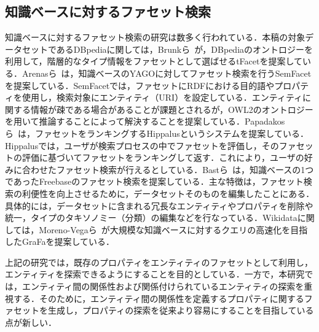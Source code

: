 \subsection{知識ベースに対するファセット検索}
知識ベースに対するファセット検索の研究は数多く行われている．本稿の対象データセットであるDBpediaに関しては，Brunkら~\cite{Brunk2011tFacetHF}が，DBpediaのオントロジーを利用して，階層的なタイプ情報をファセットとして選ばせるtFacetを提案している．Arenasら~\cite{Arenas:2014:SSF:2567948.2577011}は，知識ベースのYAGOに対してファセット検索を行うSemFacetを提案している．SemFacetでは，ファセットにRDFにおける目的語やプロパティを使用し，検索対象にエンティティ（URI）を設定している．エンティティに関する情報が疎である場合があることが課題とされるが，OWL2のオントロジーを用いて推論することによって解決することを提案している．Papadakosら~\cite{Papadakos2014HippalusPF}は，ファセットをランキングするHippalusというシステムを提案している．Hippalusでは，ユーザが検索プロセスの中でファセットを評価し，そのファセットの評価に基づいてファセットをランキングして返す．これにより，ユーザの好みに合わせたファセット検索が行えるとしている．Bastら~\cite{Bast:2014:EAF:2567948.2577016}は，知識ベースの1つであったFreebaseのファセット検索を提案している．主な特徴は，ファセット検索の利便性を向上させるために，データセットそのものを編集したことにある．具体的には，データセットに含まれる冗長なエンティティやプロパティを削除や統一，タイプのタキソノミー（分類）の編集などを行なっている．Wikidataに関しては，Moreno-Vegaら~\cite{10.1007/978-3-030-00671-6_18}が大規模な知識ベースに対するクエリの高速化を目指したGraFaを提案している．

上記の研究では，既存のプロパティをエンティティのファセットとして利用し，エンティティを探索できるようにすることを目的としている．一方で，本研究では，エンティティ間の関係性および関係付けられているエンティティの探索を重視する．そのために，エンティティ間の関係性を定義するプロパティに関するファセットを生成し，プロパティの探索を従来より容易にすることを目指している点が新しい．